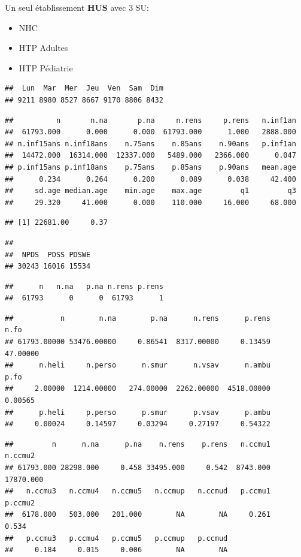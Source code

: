 \documentclass[]{article}
\begin{document}
Un seul établissement \textbf{HUS} avec 3 SU:

\begin{itemize}
\itemsep1pt\parskip0pt
\item
  NHC
\item
  HTP Adultes
\item
  HTP Pédiatrie
\end{itemize}

\begin{verbatim}
##  Lun  Mar  Mer  Jeu  Ven  Sam  Dim 
## 9211 8980 8527 8667 9170 8806 8432
\end{verbatim}

\begin{verbatim}
##          n       n.na       p.na     n.rens     p.rens   n.inf1an 
##  61793.000      0.000      0.000  61793.000      1.000   2888.000 
## n.inf15ans n.inf18ans    n.75ans    n.85ans    n.90ans   p.inf1an 
##  14472.000  16314.000  12337.000   5489.000   2366.000      0.047 
## p.inf15ans p.inf18ans    p.75ans    p.85ans    p.90ans   mean.age 
##      0.234      0.264      0.200      0.089      0.038     42.400 
##     sd.age median.age    min.age    max.age         q1         q3 
##     29.320     41.000      0.000    110.000     16.000     68.000
\end{verbatim}

\begin{verbatim}
## [1] 22681.00     0.37
\end{verbatim}

\begin{verbatim}
## 
##  NPDS  PDSS PDSWE 
## 30243 16016 15534
\end{verbatim}

\begin{verbatim}
##      n   n.na   p.na n.rens p.rens 
##  61793      0      0  61793      1
\end{verbatim}

\begin{verbatim}
##           n        n.na        p.na      n.rens      p.rens        n.fo 
## 61793.00000 53476.00000     0.86541  8317.00000     0.13459    47.00000 
##      n.heli     n.perso      n.smur      n.vsav      n.ambu        p.fo 
##     2.00000  1214.00000   274.00000  2262.00000  4518.00000     0.00565 
##      p.heli     p.perso      p.smur      p.vsav      p.ambu 
##     0.00024     0.14597     0.03294     0.27197     0.54322
\end{verbatim}

\begin{verbatim}
##         n      n.na      p.na    n.rens    p.rens   n.ccmu1   n.ccmu2 
## 61793.000 28298.000     0.458 33495.000     0.542  8743.000 17870.000 
##   n.ccmu3   n.ccmu4   n.ccmu5   n.ccmup   n.ccmud   p.ccmu1   p.ccmu2 
##  6178.000   503.000   201.000        NA        NA     0.261     0.534 
##   p.ccmu3   p.ccmu4   p.ccmu5   p.ccmup   p.ccmud 
##     0.184     0.015     0.006        NA        NA
\end{verbatim}
\end{document}

